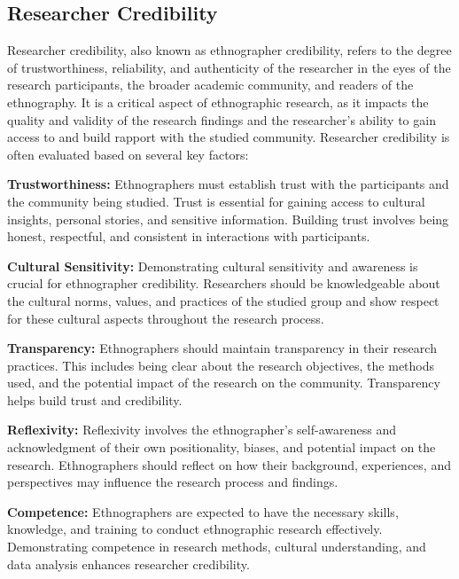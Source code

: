 \documentclass[
  b5paper]{book}
\begin{document}
\hypertarget{researcher-credibility}{%
\subsection*{Researcher Credibility}\label{researcher-credibility}}

Researcher credibility, also known as ethnographer credibility, refers to the degree of trustworthiness, reliability, and authenticity of the researcher in the eyes of the research participants, the broader academic community, and readers of the ethnography. It is a critical aspect of ethnographic research, as it impacts the quality and validity of the research findings and the researcher's ability to gain access to and build rapport with the studied community. Researcher credibility is often evaluated based on several key factors:

\textbf{Trustworthiness:} Ethnographers must establish trust with the participants and the community being studied. Trust is essential for gaining access to cultural insights, personal stories, and sensitive information. Building trust involves being honest, respectful, and consistent in interactions with participants.

\textbf{Cultural Sensitivity:} Demonstrating cultural sensitivity and awareness is crucial for ethnographer credibility. Researchers should be knowledgeable about the cultural norms, values, and practices of the studied group and show respect for these cultural aspects throughout the research process.

\textbf{Transparency:} Ethnographers should maintain transparency in their research practices. This includes being clear about the research objectives, the methods used, and the potential impact of the research on the community. Transparency helps build trust and credibility.

\textbf{Reflexivity:} Reflexivity involves the ethnographer's self-awareness and acknowledgment of their own positionality, biases, and potential impact on the research. Ethnographers should reflect on how their background, experiences, and perspectives may influence the research process and findings.

\textbf{Competence:} Ethnographers are expected to have the necessary skills, knowledge, and training to conduct ethnographic research effectively. Demonstrating competence in research methods, cultural understanding, and data analysis enhances researcher credibility.
\end{document}
